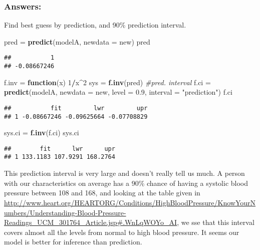 \documentclass[]{article}
\newenvironment{Shaded}{\begin{snugshade}}{\end{snugshade}}
\newcommand{\KeywordTok}[1]{\textcolor[rgb]{0.13,0.29,0.53}{\textbf{#1}}}
\newcommand{\DataTypeTok}[1]{\textcolor[rgb]{0.13,0.29,0.53}{#1}}
\newcommand{\DecValTok}[1]{\textcolor[rgb]{0.00,0.00,0.81}{#1}}
\newcommand{\FloatTok}[1]{\textcolor[rgb]{0.00,0.00,0.81}{#1}}
\newcommand{\StringTok}[1]{\textcolor[rgb]{0.31,0.60,0.02}{#1}}
\newcommand{\CommentTok}[1]{\textcolor[rgb]{0.56,0.35,0.01}{\textit{#1}}}
\newcommand{\ControlFlowTok}[1]{\textcolor[rgb]{0.13,0.29,0.53}{\textbf{#1}}}
\newcommand{\OperatorTok}[1]{\textcolor[rgb]{0.81,0.36,0.00}{\textbf{#1}}}
\newcommand{\NormalTok}[1]{#1}
\begin{document}
\subsubsection{Answers:}\label{answers-3}

{ Find best guess by prediction, and 90\% prediction interval.}

\begin{Shaded}
\begin{Highlighting}[]
\NormalTok{pred =}\StringTok{ }\KeywordTok{predict}\NormalTok{(modelA, }\DataTypeTok{newdata =}\NormalTok{ new)}
\NormalTok{pred}
\end{Highlighting}
\end{Shaded}

\begin{verbatim}
##           1 
## -0.08667246
\end{verbatim}

\begin{Shaded}
\begin{Highlighting}[]
\NormalTok{f.inv =}\StringTok{ }\ControlFlowTok{function}\NormalTok{(x) }\DecValTok{1}\OperatorTok{/}\NormalTok{x}\OperatorTok{^}\DecValTok{2}
\NormalTok{sys =}\StringTok{ }\KeywordTok{f.inv}\NormalTok{(pred)}
\CommentTok{#pred. interval}
\NormalTok{f.ci =}\StringTok{ }\KeywordTok{predict}\NormalTok{(modelA, }\DataTypeTok{newdata =}\NormalTok{ new, }\DataTypeTok{level =} \FloatTok{0.9}\NormalTok{, }\DataTypeTok{interval =} \StringTok{"prediction"}\NormalTok{)}
\NormalTok{f.ci}
\end{Highlighting}
\end{Shaded}

\begin{verbatim}
##           fit         lwr         upr
## 1 -0.08667246 -0.09625664 -0.07708829
\end{verbatim}

\begin{Shaded}
\begin{Highlighting}[]
\NormalTok{sys.ci =}\StringTok{ }\KeywordTok{f.inv}\NormalTok{(f.ci)}
\NormalTok{sys.ci}
\end{Highlighting}
\end{Shaded}

\begin{verbatim}
##        fit      lwr      upr
## 1 133.1183 107.9291 168.2764
\end{verbatim}

This prediction interval is very large and doesn't really tell us much.
A person with our characteristics on average has a 90\% chance of having
a systolic blood pressure between 108 and 168, and looking at the table
given in
\url{http://www.heart.org/HEARTORG/Conditions/HighBloodPressure/KnowYourNumbers/Understanding-Blood-Pressure-Readings_UCM_301764_Article.jsp\#.WnLqWOYo_AI},
we sse that this interval covers almost all the levels from normal to
high blood pressure. It seems our model is better for inference than
prediction.
\end{document}

